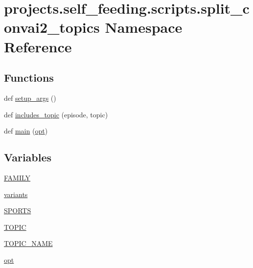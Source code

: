 \hypertarget{namespaceprojects_1_1self__feeding_1_1scripts_1_1split__convai2__topics}{}\section{projects.\+self\+\_\+feeding.\+scripts.\+split\+\_\+convai2\+\_\+topics Namespace Reference}
\label{namespaceprojects_1_1self__feeding_1_1scripts_1_1split__convai2__topics}
\subsection*{Functions}
\begin{DoxyCompactItemize}
\item 
def \hyperlink{namespaceprojects_1_1self__feeding_1_1scripts_1_1split__convai2__topics_a182c9e1c2ca6bd71added31ed7088eee}{setup\+\_\+args} ()
\item 
def \hyperlink{namespaceprojects_1_1self__feeding_1_1scripts_1_1split__convai2__topics_a273e2c722d60a60b074557be2a4a0714}{includes\+\_\+topic} (episode, topic)
\item 
def \hyperlink{namespaceprojects_1_1self__feeding_1_1scripts_1_1split__convai2__topics_ab05b7abb9e9f7c1778462fc1ac5345f1}{main} (\hyperlink{namespaceprojects_1_1self__feeding_1_1scripts_1_1split__convai2__topics_a3a3184ed43bb1ecfc3330803dec67fef}{opt})
\end{DoxyCompactItemize}
\subsection*{Variables}
\begin{DoxyCompactItemize}
\item 
\hyperlink{namespaceprojects_1_1self__feeding_1_1scripts_1_1split__convai2__topics_afcf2d3a3ba026d41f6d5cf107671635c}{F\+A\+M\+I\+LY}
\item 
\hyperlink{namespaceprojects_1_1self__feeding_1_1scripts_1_1split__convai2__topics_a54016deb63e36991b25b4c5ede156cce}{variants}
\item 
\hyperlink{namespaceprojects_1_1self__feeding_1_1scripts_1_1split__convai2__topics_af4e3932eeea9a50be4828afa5293463c}{S\+P\+O\+R\+TS}
\item 
\hyperlink{namespaceprojects_1_1self__feeding_1_1scripts_1_1split__convai2__topics_a19929460ef03f47e429d42c10b775246}{T\+O\+P\+IC}
\item 
\hyperlink{namespaceprojects_1_1self__feeding_1_1scripts_1_1split__convai2__topics_afd6b96122ea40ea088282be7a637282b}{T\+O\+P\+I\+C\+\_\+\+N\+A\+ME}
\item 
\hyperlink{namespaceprojects_1_1self__feeding_1_1scripts_1_1split__convai2__topics_a3a3184ed43bb1ecfc3330803dec67fef}{opt}
\end{DoxyCompactItemize}


